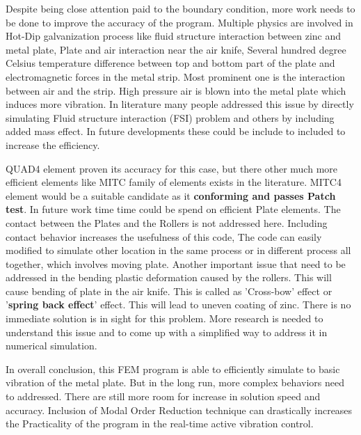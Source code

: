 \documentclass[main.tex]{subfiles}
\begin{document}
Despite being close attention paid to the boundary condition, more work needs to be done to improve the accuracy of the program. Multiple physics are involved in Hot-Dip galvanization process like fluid structure interaction between zinc and metal plate, Plate and air interaction near the air knife, Several hundred degree Celsius temperature difference between top and bottom part of the plate and electromagnetic forces in the metal strip. Most prominent one is the interaction between air and the strip. High pressure air is blown into the metal plate which induces more vibration. In literature many people addressed this issue by directly simulating Fluid structure interaction (FSI) problem and others by including added mass effect. In future developments these could be include to included to increase the efficiency. 

QUAD4 element proven its accuracy for this case, but there other much more efficient elements like MITC family of elements exists in the literature. MITC4 element would be a suitable candidate as it\textbf{ conforming and passes Patch test}. In future work time time could be spend on efficient Plate elements.  The contact between the Plates and the Rollers is not addressed here. Including contact behavior increases the usefulness of this code, The code can easily modified to simulate other location in the same process or in different process all together, which involves moving plate. Another important issue that need to be addressed in the bending plastic deformation caused by the rollers. This will cause  bending of  plate in the air knife. This is called as 'Cross-bow' effect or '\textbf{spring back effect}' effect. This will lead to uneven coating of zinc.  There is no immediate solution is in sight for this problem. More research is needed to understand this issue and to come up with a simplified way to address it in numerical simulation. 

In overall conclusion, this FEM program is able to efficiently simulate to basic vibration of the metal plate. But in the long run, more complex behaviors need to addressed. There are still more room for increase in solution speed and accuracy. Inclusion of Modal Order Reduction technique can drastically increases the Practicality of the program in the real-time active vibration control.
\end{document}

